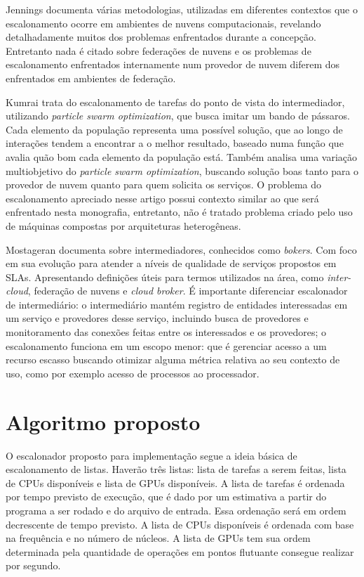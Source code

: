 Jennings\cite{Jennings:2015:RMC:2793474.2793493} documenta  várias metodologias, utilizadas em diferentes contextos que o escalonamento ocorre em ambientes de nuvens computacionais, revelando detalhadamente muitos dos problemas enfrentados durante a concepção. Entretanto nada é citado sobre federações de nuvens e os problemas de escalonamento enfrentados internamente num provedor de nuvem diferem dos enfrentados em ambientes de federação.

Kumrai\cite{7467407} trata do escalonamento de tarefas do ponto de vista do intermediador, utilizando \textit{particle swarm optimization}, que busca imitar um bando de pássaros. Cada elemento da população representa uma possível solução, que ao longo de interações tendem a encontrar a o melhor resultado, baseado numa função que avalia quão bom cada elemento da população está. Também analisa uma variação multiobjetivo do \textit{particle swarm optimization}, buscando solução boas tanto para o provedor de nuvem quanto para quem solicita os serviços. O problema do escalonamento apreciado nesse artigo possui contexto similar ao que será enfrentado nesta monografia, entretanto, não é tratado problema criado pelo uso de máquinas compostas por arquiteturas heterogêneas.

Mostageran\cite{7224588} documenta sobre intermediadores, conhecidos como \textit{bokers}. Com foco em sua evolução para atender a níveis de qualidade de serviços propostos em \acrshort{SLA}s. Apresentando definições úteis para termos utilizados na área, como \textit{inter-cloud}, federação de nuvens e \textit{cloud broker}. É importante diferenciar escalonador de intermediário: o intermediário mantém registro de entidades interessadas em um serviço e provedores desse serviço, incluindo busca de provedores e monitoramento das conexões feitas entre os interessados e os provedores; o escalonamento funciona em um escopo menor: que é gerenciar acesso a um recurso escasso buscando otimizar alguma métrica relativa ao seu contexto de uso, como por exemplo acesso de processos ao processador.

\section{Algoritmo proposto}

O escalonador proposto para implementação segue a ideia básica de escalonamento de listas. Haverão três listas: lista de tarefas a serem feitas, lista de \acrshort{CPU}s disponíveis e lista de \acrshort{GPU}s disponíveis.
A lista de tarefas é ordenada por tempo previsto de execução, que é dado por um estimativa a partir do programa a ser rodado e do arquivo de entrada. Essa ordenação será em ordem decrescente de tempo previsto. A lista de \acrshort{CPU}s disponíveis é ordenada com base na frequência e no número de núcleos. A lista de \acrshort{GPU}s tem sua ordem determinada pela quantidade de operações em pontos flutuante consegue realizar por segundo.


